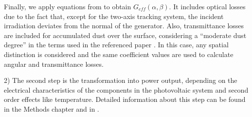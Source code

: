 Finally, we apply equations from \cite{Martin2001} to obtain $G_{eff}(\alpha, \beta)$. It includes optical losses due to the fact that, except for the two-axis tracking system, the incident irradiation deviates from the normal of the generator. Also, transmittance losses are included for accumulated dust over the surface, considering a ``moderate dust degree'' in the terms used in the referenced paper \cite{Martin2001}. In this case, any spatial distinction is considered and the same coefficient values are used to calculate angular and transmittance losses. 

2) The second step is the transformation into power output, depending on the electrical characteristics of the components in the photovoltaic system and second order effects like temperature. Detailed information about this step can be found in the Methods chapter and in \cite{Perpinan2009}.




